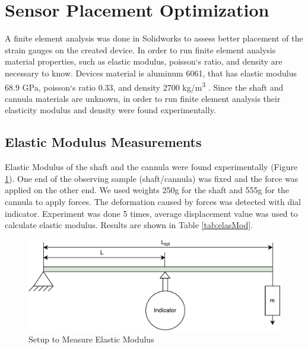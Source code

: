 \section{Sensor Placement Optimization}
\label{sec:SimMod}
A finite element analysis was done in Solidworks to assess better placement of the strain gauges on the created device. In order to run finite element analysis material properties, such as elastic modulus, poisson`s ratio, and density are necessary to know. Devices material is aluminum 6061, that has elastic modulus 68.9 GPa, poisson`s ratio 0.33, and density 2700 kg/m\textsuperscript{3} \cite{aluminum_properties}. Since the shaft and cannula materials are unknown, in order to run finite element analysis their elasticity modulus and density were found experimentally.
	
	\subsection{Elastic Modulus Measurements}
	\label{sec:ElasMod}
	Elastic Modulus of the shaft and the cannula were found experimentally (Figure \ref{fig:ElasModSet}). One end of the observing sample (shaft/cannula) was fixed and the force was applied on the other end. We used weights 250g for the shaft and 555g for the cannula to apply forces. The deformation caused by forces was detected with dial indicator. Experiment was done 5 times, average displacement value was used to calculate elastic modulus. Results are shown in Table \ref{tab:elasMod}.
	
\begin{figure}[h]
	\begin{center}
		\includegraphics[width=120mm]{fig/methods/el_mod_set.pdf}
	\end{center}
	\vspace{-4mm}
	\caption[Setup to Measure Elastic Modulus]
	{Setup to Measure Elastic Modulus}
	\label{fig:ElasModSet}
	\vspace{-2mm}
\end{figure}

